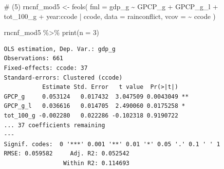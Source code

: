 \documentclass[
  a4paper,
  DIV=11,
  oneside]{scrreprt}
\newenvironment{Shaded}{\begin{snugshade}}{\end{snugshade}}
\newcommand{\AttributeTok}[1]{\textcolor[rgb]{0.40,0.45,0.13}{#1}}
\newcommand{\CommentTok}[1]{\textcolor[rgb]{0.37,0.37,0.37}{#1}}
\newcommand{\DecValTok}[1]{\textcolor[rgb]{0.68,0.00,0.00}{#1}}
\newcommand{\FunctionTok}[1]{\textcolor[rgb]{0.28,0.35,0.67}{#1}}
\newcommand{\NormalTok}[1]{\textcolor[rgb]{0.00,0.23,0.31}{#1}}
\newcommand{\OtherTok}[1]{\textcolor[rgb]{0.00,0.23,0.31}{#1}}
\newcommand{\SpecialCharTok}[1]{\textcolor[rgb]{0.37,0.37,0.37}{#1}}
\newcommand{\StringTok}[1]{\textcolor[rgb]{0.13,0.47,0.30}{#1}}
\begin{document}
\begin{Shaded}
\begin{Highlighting}[]
\CommentTok{\# (5)}
\NormalTok{rncnf\_mod5 }\OtherTok{\textless{}{-}} \FunctionTok{feols}\NormalTok{(}
  \AttributeTok{fml =}\NormalTok{ gdp\_g }\SpecialCharTok{\textasciitilde{}}\NormalTok{ GPCP\_g }\SpecialCharTok{+}\NormalTok{ GPCP\_g\_l }
  \SpecialCharTok{+}\NormalTok{ tot\_100\_g }
  \SpecialCharTok{+}\NormalTok{ year}\SpecialCharTok{:}\NormalTok{ccode }
  \SpecialCharTok{|}\NormalTok{ ccode,}
  \AttributeTok{data =}\NormalTok{ rainconflict,}
  \AttributeTok{vcov =} \SpecialCharTok{\textasciitilde{}}\NormalTok{ ccode}
\NormalTok{) }

\NormalTok{rncnf\_mod5 }\SpecialCharTok{\%\textgreater{}\%}
  \FunctionTok{print}\NormalTok{(}\AttributeTok{n =} \DecValTok{3}\NormalTok{)}
\end{Highlighting}
\end{Shaded}

\begin{verbatim}
OLS estimation, Dep. Var.: gdp_g
Observations: 661
Fixed-effects: ccode: 37
Standard-errors: Clustered (ccode) 
           Estimate Std. Error   t value  Pr(>|t|)    
GPCP_g     0.053124   0.017432  3.047509 0.0043049 ** 
GPCP_g_l   0.036616   0.014705  2.490060 0.0175258 *  
tot_100_g -0.002280   0.022286 -0.102318 0.9190722    
... 37 coefficients remaining
---
Signif. codes:  0 '***' 0.001 '**' 0.01 '*' 0.05 '.' 0.1 ' ' 1
RMSE: 0.059582     Adj. R2: 0.052542
                 Within R2: 0.114693
\end{verbatim}

\begin{Shaded}
\end{Shaded}
\end{document}
